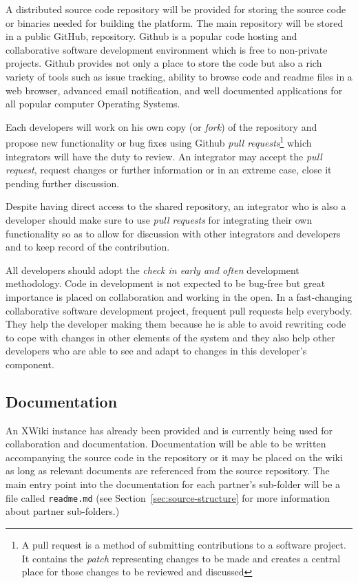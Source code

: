 A distributed source code repository will be provided for storing the source code or binaries
needed for building the \learnpad platform. The main repository will be stored in a public GitHub,
repository. Github is a popular code hosting and collaborative software development environment
which is free to non-private projects. Github provides not only a place to store the code but also
a rich variety of tools such as issue tracking, ability to browse code and readme files in a web
browser, advanced email notification, and well documented applications for all popular computer
Operating Systems.

Each developers will work on his own copy (or \emph{fork}) of the repository and propose new
functionality or bug fixes using Github \emph{pull requests}\footnote{A pull request is a method of
submitting contributions to a software project. It contains the \emph{patch} representing changes to
be made and creates a central place for those changes to be reviewed and discussed} which
integrators will have the duty to review. An integrator may accept the \emph{pull request},
request changes or further information or in an extreme case, close it pending further discussion.

Despite having direct access to the shared repository, an integrator who is also a developer should
make sure to use \emph{pull requests} for integrating their own functionality so as to allow for
discussion with other integrators and developers and to keep record of the contribution.

All developers should adopt the \emph{check in early and often} development methodology.
Code in development is not expected to be bug-free but great importance is placed on collaboration
and working in the open. In a fast-changing collaborative software development project, frequent
pull requests help everybody. They help the developer making them because he is able to avoid
rewriting code to cope with changes in other elements of the system and they also help other
developers who are able to see and adapt to changes in this developer's component.

\subsection{Documentation}
\label{sec:documentation}

An XWiki instance has already been provided and is currently being used for collaboration and
documentation. Documentation will be able to be written accompanying the source code in the
repository or it may be placed on the wiki as long as relevant documents are referenced from the
source repository. The main entry point into the documentation for each partner's sub-folder will
be a file called \texttt{readme.md} (see Section~\ref{sec:source-structure} for more information
about partner sub-folders.)

